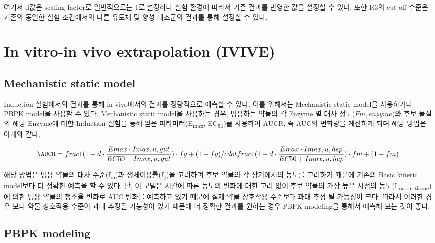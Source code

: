 \documentclass[
  11pt,
  krantz2, a4paper, twoside]{krantz}
\begin{document}
여기서 d값은 scaling factor로 일반적으로는 1로 설정하나 실험 환경에 따라서 기존 결과를 반영한 값을 설정할 수 있다. 또한 R3의 cut-off 수준은 기존의 동일한 실험 조건에서의 다른 유도체 및 양성 대조군의 결과를 통해 설정할 수 있다.

\section{In vitro-in vivo extrapolation (IVIVE)}\label{in-vitro-in-vivo-extrapolation-ivive}

\subsection{Mechanistic static model}\label{mechanistic-static-model}

Induction 실험에서의 결과를 통해 in vivo에서의 결과를 정량적으로 예측할 수 있다. 이를 위해서는 Mechanistic static model을 사용하거나 PBPK model을 사용할 수 있다. Mechanistic static model을 사용하는 경우, 병용하는 약물의 각 Enzyme 별 대사 정도(\(F{m, enzyme}\))와 후보 물질의 해당 Enzyme에 대한 Induction 실험을 통해 얻은 파라미터(E\textsubscript{max}, EC\textsubscript{50})를 사용하여 AUCR, 즉 AUC의 변화량을 계산하게 되며 해당 방법은 아래와 같다.

\begin{equation}
\AUCR = frac{1}{(1 + d \cdot \frac{E{max} \cdot I{max,u,gut}}{EC{50} + I{max,u,gut}}) \cdot f{g} + (1 - f{g})} /cdot frac{1}{(1 + d \cdot \frac{E{max} \cdot I{max,u,hep}}{EC{50} + I{max,u,hep}}) \cdot f{m} + (1 - f{m})} 
\label{eq:eq06-5}
\end{equation}

해당 방법은 병용 약물의 대사 수준(f\textsubscript{m})과 생체이용률(f\textsubscript{g})을 고려하며 후보 약물의 각 장기에서의 농도를 고려하기 때문에 기존의 Basic kinetic model보다 더 정확한 예측을 할 수 있다. 단, 이 모델은 시간에 따른 농도의 변화에 대한 고려 없이 후보 약물의 가장 높은 시점의 농도(I\textsubscript{max,u,tissue})에 의한 병용 약물의 청소율 변화로 AUC 변화를 예측하고 있기 때문에 실제 약물 상호작용 수준보다 과대 추정 될 가능성이 크다. 따라서 이러한 경우 보다 약물 상호작용 수준이 과대 추정될 가능성이 있기 때문에 더 정확한 결과를 원하는 경우 PBPK modeling을 통해서 예측해 보는 것이 좋다.

\subsection{PBPK modeling}\label{pbpk-modeling}
\end{document}

